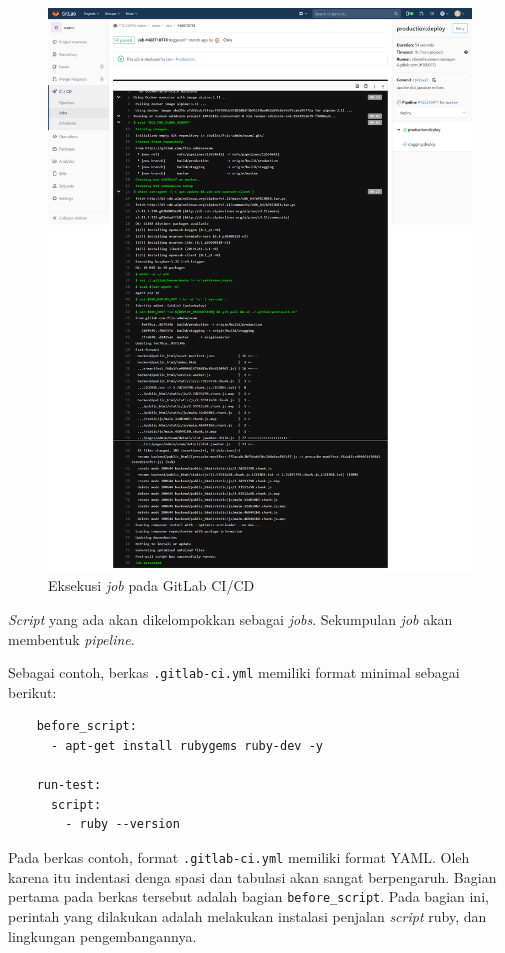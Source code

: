     \begin{figure}
        \centering
        \includegraphics[width=0.7\paperwidth]{Gambar/gitlab-ci-job-view.png}
        \caption{Eksekusi \textit{job} pada GitLab CI/CD}
        \label{fig:gitlab-ci:jobrun}
    \end{figure}
    
    
    \textit{Script} yang ada akan dikelompokkan sebagai \textit{jobs}. Sekumpulan \textit{job} akan membentuk \textit{pipeline}.
    
    Sebagai contoh, berkas \texttt{.gitlab-ci.yml} memiliki format minimal sebagai berikut:
    
    \begin{verbatim}
    before_script:
      - apt-get install rubygems ruby-dev -y

    run-test:
      script:
        - ruby --version
    \end{verbatim}
    
    Pada berkas contoh, format \texttt{.gitlab-ci.yml} memiliki format YAML. Oleh karena itu indentasi denga spasi dan tabulasi akan sangat berpengaruh. Bagian pertama pada berkas tersebut adalah bagian \texttt{before\_script}. Pada bagian ini, perintah yang dilakukan adalah melakukan instalasi penjalan \textit{script} ruby, dan lingkungan pengembangannya.
    
